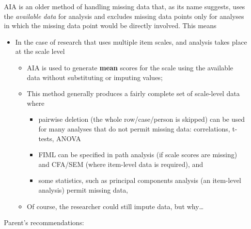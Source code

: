 \documentclass[
  english,
]{book}
\providecommand{\tightlist}{%
  \setlength{\itemsep}{0pt}\setlength{\parskip}{0pt}}
\begin{document}
AIA is an older method of handling missing data that, as its name suggests, uses the \emph{available data} for analysis and excludes missing data points only for analyses in which the missing data point would be directly involved. This means

\begin{itemize}
\tightlist
\item
  In the case of research that uses multiple item scales, and analysis takes place at the scale level

  \begin{itemize}
  \tightlist
  \item
    AIA is used to generate \textbf{mean} scores for the scale using the available data without substituting or imputing values;
  \item
    This method generally produces a fairly complete set of scale-level data where

    \begin{itemize}
    \tightlist
    \item
      pairwise deletion (the whole row/case/person is skipped) can be used for many analyses that do not permit missing data: correlations, t-tests, ANOVA
    \item
      FIML can be specified in path analysis (if scale scores are missing) and CFA/SEM (where item-level data is required), and
    \item
      some statistics, such as principal components analysis (an item-level analysis) permit missing data,
    \end{itemize}
  \item
    Of course, the researcher could still impute data, but why\ldots{}
  \end{itemize}
\end{itemize}

Parent's\citeyearpar{parent_handling_2013} recommendations:
\end{document}
